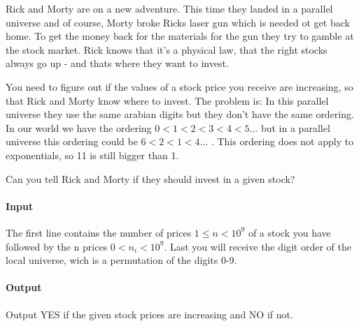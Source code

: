 



\makeheader

Rick and Morty are on a new adventure. This time they landed in a parallel universe and of course, Morty broke Ricks laser gun which is needed ot get back home. To get the money back for the materials for the gun they try to gamble at the stock market. Rick knows that it's a physical law, that the right stocks always go up - and thats where they want to invest. 

You need to figure out if the values of a stock price you receive are increasing, so that Rick and Morty know where to invest. The problem is: In this parallel universe they use the same arabian digits but they don't have the same ordering. In our world we have the ordering $0 < 1 < 2 < 3 < 4 < 5 ...$ but in a parallel universe this ordering could be $6 < 2 < 1 < 4 \dots$ . This ordering does not apply to exponentials, so 11 is still bigger than 1.

Can you tell Rick and Morty if they should invest in a given stock?

\paragraph*{Input}

The first line contains the number of prices $1\leq n<10^9$ of a stock you have followed by the n prices $0<n_i<10^9$. Last you will receive the digit order of the local universe, wich is a permutation of the digits 0-9.

\paragraph*{Output}

Output YES if the given stock prices are increasing and NO if not. 

\begin{samples}
\end{samples}


